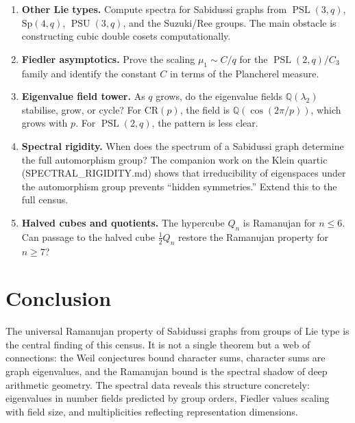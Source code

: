 \documentclass[11pt,a4paper]{article}
\theoremstyle{plain}
\theoremstyle{definition}
\theoremstyle{remark}
\newcommand{\PSL}{\operatorname{PSL}}
\newcommand{\PSU}{\operatorname{PSU}}
\begin{document}
\begin{enumerate}
\item \textbf{Other Lie types.} Compute spectra for Sabidussi graphs from
  $\PSL(3,q)$, $\mathrm{Sp}(4,q)$, $\PSU(3,q)$, and the Suzuki/Ree
  groups. The main obstacle is constructing cubic double cosets
  computationally.

\item \textbf{Fiedler asymptotics.} Prove the scaling
  $\mu_1 \sim C/q$ for the $\PSL(2,q)/C_3$ family and identify the
  constant $C$ in terms of the Plancherel measure.

\item \textbf{Eigenvalue field tower.} As $q$ grows, do the eigenvalue
  fields $\mathbb{Q}(\lambda_2)$ stabilise, grow, or cycle? For
  $\mathrm{CR}(p)$, the field is $\mathbb{Q}(\cos(2\pi/p))$, which
  grows with $p$. For $\PSL(2,q)$, the pattern is less clear.

\item \textbf{Spectral rigidity.} When does the spectrum of a Sabidussi
  graph determine the full automorphism group? The companion work on the
  Klein quartic (SPECTRAL\_RIGIDITY.md) shows that irreducibility of
  eigenspaces under the automorphism group prevents ``hidden symmetries.''
  Extend this to the full census.

\item \textbf{Halved cubes and quotients.} The hypercube $Q_n$ is Ramanujan
  for $n \le 6$. Can passage to the halved cube $\tfrac{1}{2}Q_n$ restore
  the Ramanujan property for $n \ge 7$?
\end{enumerate}


\section{Conclusion}

The universal Ramanujan property of Sabidussi graphs from groups of Lie
type is the central finding of this census. It is not a single theorem but
a web of connections: the Weil conjectures bound character sums, character
sums are graph eigenvalues, and the Ramanujan bound is the spectral shadow
of deep arithmetic geometry. The spectral data reveals this structure
concretely: eigenvalues in number fields predicted by group orders, Fiedler
values scaling with field size, and multiplicities reflecting representation
dimensions.
\end{document}
